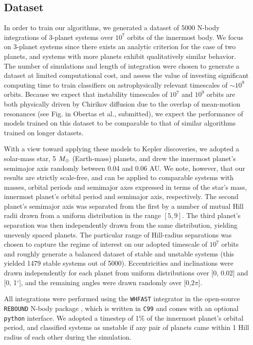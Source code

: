 \subsection{Dataset} \label{dataset}
In order to train our algorithms, we generated a dataset of 5000 N-body integrations of 3-planet systems over $10^7$ orbits of the innermost body.
We focus on 3-planet systems since there exists an analytic criterion for the case of two planets, and systems with more planets exhibit qualitatively similar behavior.
The number of simulations and length of integration were chosen to generate a dataset at limited computational cost, and assess the value of investing significant computing time to train classifiers on astrophysically relevant timescales of $\sim 10^9$ orbits.
Because we expect that instability timescales of $10^7$ and $10^9$ orbits are both physically driven by Chirikov diffusion due to the overlap of mean-motion resonances (see Fig. in Obertas et al., submitted), we expect the performance of models trained on this dataset to be comparable to that of similar algorithms trained on longer datasets.

With a view toward applying these models to Kepler discoveries, we adopted a solar-mass star, 5 $M_\oplus$ (Earth-mass) planets, and drew the innermost planet's semimajor axis randomly between 0.04 and 0.06 AU.
We note, however, that our results are strictly scale-free, and can be applied to comparable systems with masses, orbital periods and semimajor axes expressed in terms of the star's mass, innermost planet's orbital period and semimajor axis, respectively.
The second planet's semimajor axis was separated from the first by a number of mutual Hill radii drawn from a uniform distribution in the range $[5,9]$.  
The third planet's separation was then independently drawn from the same distribution, yielding unevenly spaced planets.
The particular range of Hill-radius separations was chosen to capture the regime of interest on our adopted timescale of $10^7$ orbits and roughly generate a balanced dataset of stable and unstable systems (this yielded 1479 stable systems out of 5000).
Eccentricities and inclinations were drawn independently for each planet from uniform distributions over [0, 0.02] and [0, 1$^\circ$], and the remaining angles were drawn randomly over [0,$2\pi$].

All integrations were performed using the {\sc \tt WHFAST} integrator \citep{ReinTamayo15} in the open-source {\sc \tt REBOUND} N-body package \citep{Rein12}, which is written in \texttt{C99} and comes with an optional \texttt{python} interface.
We adopted a timestep of 1\% of the innermost planet's orbital period, and classified systems as unstable if any pair of planets came within 1 Hill radius of each other during the simulation.

